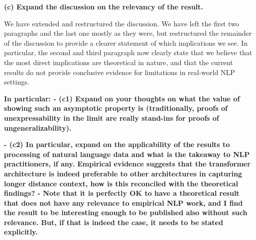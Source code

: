 \documentclass[11pt,a4paper]{article}
\newcommand\response[1]{{\color{blue}#1}}
\newcommand\original[1]{\textbf{#1}}
\begin{document}
\original{(c) Expand the discussion on the relevancy of the result.}

\response{We have extended and restructured the discussion. We have left the first two paragraphs and the last one mostly as they were, but restructured the remainder of the discussion to provide a clearer statement of which implications we see. In particular, the second and third paragraph now clearly state that we believe that the most direct implications are theoretical in nature, and that the current results do not provide conclusive evidence for limitations in real-world NLP settings.}

\original{In particular:
- (c1) Expand on your thoughts on what the value of showing such an
asymptotic property is (traditionally, proofs of unexpressability in the
limit are really stand-ins for proofs of ungeneralizability).}

\original{- (c2) In particular, expand on the applicability of the results to
processing of natural language data and what is the takeaway to NLP
practitioners, if any. Empirical evidence suggests that the transformer
architecture is indeed preferable to other architectures in capturing longer
distance context, how is this reconciled with the theoretical findings?
- Note that it is perfectly OK to have a theoretical result that does not
have any relevance to empirical NLP work, and I find the result to be
interesting enough to be published also without such relevance. But, if that
is indeed the case, it needs to be stated explicitly.}
\end{document}
